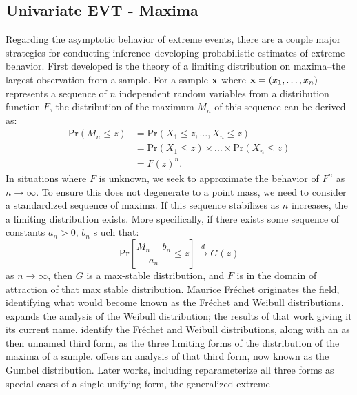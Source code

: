 \subsection{Univariate EVT - Maxima}
Regarding the asymptotic behavior of extreme events, there are a couple major strategies for conducting
  inference--developing probabilistic estimates of extreme behavior.  First developed is the theory
  of a limiting distribution on maxima--the largest observation from a sample.  For a sample ${\bf x}$
  where ${\bf x} = (x_1,\ldots,x_n)$ represents a sequence of $n$ independent random variables from a
  distribution function $F$, the distribution of the maximum $M_n$ of this sequence can be derived
  as:
  \begin{equation*}
    \begin{aligned}
      \text{Pr}(M_n\leq z) &= \text{Pr}(X_1 \leq z, \ldots, X_n \leq z)\\
        &= \text{Pr}(X_1\leq z)\times\ldots\times\text{Pr}(X_n\leq z)\\
        &= F(z)^n.
    \end{aligned}
  \end{equation*}
  In situations where $F$ is unknown, we seek to approximate the behavior of $F^n$ as
  $n\rightarrow\infty$.  To ensure this does not degenerate to a point mass, we need to consider a
  standardized sequence of maxima. If this sequence stabilizes as $n$ increases, the a limiting
  distribution exists.  More specifically, if there exists some sequence of constants $a_n > 0$, $b_n$ s
  uch that:
  \begin{equation*}
    \text{Pr}\left[\frac{M_n - b_n}{a_n} \leq z\right] \stackrel{d}{\rightarrow} G(z)
  \end{equation*}
  as $n\rightarrow\infty$, then $G$ is a max-stable distribution, and $F$ is in the domain of
  attraction of that max stable distribution.  Maurice Fr{\'e}chet \cite{frechet1927} originates the
  field, identifying what would become known as the Fr{\'e}chet and Weibull distributions.
  \cite{weibull1951} expands the analysis of the Weibull distribution; the results
  of that work giving it its current name.  \cite{fisher1928} identify the Fr{\'e}chet
  and Weibull distributions, along with an as then unnamed third form, as the three limiting forms of
  the distribution of the maxima of a sample.  \cite{gumbel1935,gumbel1942} offers an analysis of that
  third form, now known as the Gumbel distribution.  Later works, including \cite{jenkinson1955}
  reparameterize all three forms as special cases of a single unifying form, the generalized extreme
